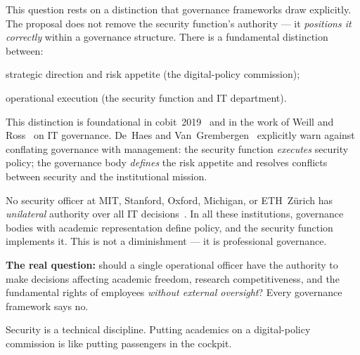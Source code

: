 \begin{answerbox}[Answer to Q2.3]
This question rests on a distinction that governance frameworks draw explicitly. The proposal does not remove the security function's authority --- it \emph{positions it correctly} within a governance structure. There is a fundamental distinction between:

\begin{description}[nosep]
    \item[Governance:] strategic direction and risk appetite (the digital-policy commission);
    \item[Management:] operational execution (the security function and IT department).
\end{description}

This distinction is foundational in \gls{cobit}~2019~\cite{cobit} and in the work of Weill and Ross~\cite{weill-ross} on IT governance. De~Haes and Van~Grembergen~\cite{dehaes2015} explicitly warn against conflating governance with management: the security function \emph{executes} security policy; the governance body \emph{defines} the risk appetite and resolves conflicts between security and the institutional mission.

\medskip\noindent No security officer at MIT, Stanford, Oxford, Michigan, or ETH~Z\"urich has \emph{unilateral} authority over all IT decisions~\cite{umich-it-council, oxford-infosec}. In all these institutions, governance bodies with academic representation define policy, and the security function implements it. This is not a diminishment --- it is professional governance.

\medskip\noindent\textbf{The real question:} should a single operational officer have the authority to make decisions affecting academic freedom, research competitiveness, and the fundamental rights of employees \emph{without external oversight}? Every governance framework says no.
\end{answerbox}

\bigskip

\begin{clarificationbox}
Security is a technical discipline. Putting academics on a digital-policy commission is like putting passengers in the cockpit.
\end{clarificationbox}

